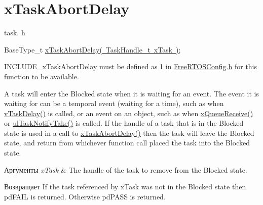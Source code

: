 \hypertarget{group__x_task_abort_delay}{}\section{x\+Task\+Abort\+Delay}
\label{group__x_task_abort_delay}
task. h 
\begin{DoxyPre}BaseType\_t \mbox{\hyperlink{task_8h_afefe333df0492c8411c0094badd25185}{xTaskAbortDelay( TaskHandle\_t xTask )}};\end{DoxyPre}


I\+N\+C\+L\+U\+D\+E\+\_\+x\+Task\+Abort\+Delay must be defined as 1 in \mbox{\hyperlink{_free_r_t_o_s_config_8h}{Free\+R\+T\+O\+S\+Config.\+h}} for this function to be available.

A task will enter the Blocked state when it is waiting for an event. The event it is waiting for can be a temporal event (waiting for a time), such as when \mbox{\hyperlink{task_8h_aa154068cecd7f31446a7a84af44ab1a3}{v\+Task\+Delay()}} is called, or an event on an object, such as when \mbox{\hyperlink{queue_8h_ae8364d988c6f9b63c771cc2b3dfe5df9}{x\+Queue\+Receive()}} or \mbox{\hyperlink{task_8h_a66540bef602522a01a519f776e4c07d8}{ul\+Task\+Notify\+Take()}} is called. If the handle of a task that is in the Blocked state is used in a call to \mbox{\hyperlink{task_8h_afefe333df0492c8411c0094badd25185}{x\+Task\+Abort\+Delay()}} then the task will leave the Blocked state, and return from whichever function call placed the task into the Blocked state.


\begin{DoxyParams}{Аргументы}
{\em x\+Task} & The handle of the task to remove from the Blocked state.\\
\hline
\end{DoxyParams}
\begin{DoxyReturn}{Возвращает}
If the task referenced by x\+Task was not in the Blocked state then pd\+F\+A\+IL is returned. Otherwise pd\+P\+A\+SS is returned. 
\end{DoxyReturn}
